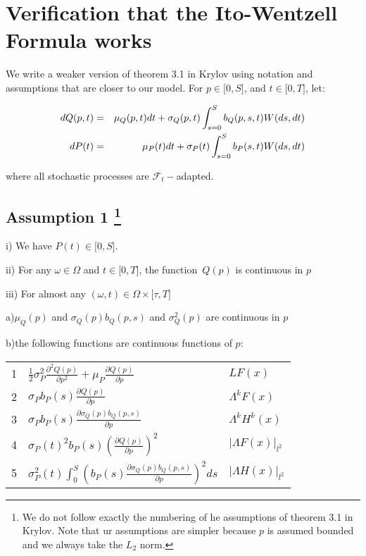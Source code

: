\documentclass{article}
\begin{document}
\section{Verification that the Ito-Wentzell Formula works}

We write a weaker version of theorem 3.1 in Krylov using notation and
assumptions that are closer to our model. For $p\in \lbrack 0,S]$, and $t\in
\lbrack 0,T]$, let:

\begin{eqnarray}
dQ(p,t) &=&\mu _{Q}(p,t)dt+\sigma _{Q}(p,t)\int_{s=0}^{S}b_{Q}(p,s,t)W(ds,dt)
\label{dQ} \\
dP(t) &=&\mu _{P}(t)dt+\sigma _{P}(t)\int_{s=0}^{S}b_{P}(s,t)W(ds,dt)  \notag
\end{eqnarray}

where all stochastic processes are $\mathcal{F}_{t}-$adapted.

\bigskip

\subsection{Assumption 1 \protect\footnote{%
We do not follow exactly the numbering of he assumptions of theorem 3.1 in
Krylov. Note that ur assumptions are simpler because $p$ is assumed bounded
and we always take the $L_{2}$ norm.}}

i) We have $P(t)\in \lbrack 0,S]$.

ii) For any $\omega \in \Omega $ and $t\in \lbrack 0,T]$, the function\ $%
Q(p) $ is continuous in $p$

iii) For almost any $(\omega ,t)\in \Omega \times \lbrack \tau ,T]$

\qquad a)$\mu _{Q}(p)$ and $\sigma _{Q}(p)b_{Q}(p,s)$ and $\sigma
_{Q}^{2}(p) $ are continuous in $p$

\qquad b)the following functions are continuous functions of $p$:

\qquad \qquad 
\begin{tabular}{lll}
1 & $\frac{1}{2}\sigma _{P}^{2}\frac{\partial ^{2}Q(p)}{\partial p^{2}}+\mu
_{P}\frac{\partial Q(p)}{\partial p}$ & $LF(x)$ \\ 
2 & $\sigma _{P}b_{P}(s)\frac{\partial Q(p)}{\partial p}$ & $\Lambda
^{k}F(x) $ \\ 
3 & $\sigma _{P}b_{P}(s)\frac{\partial \sigma _{Q}(p)b_{Q}(p,s)}{\partial p}$
& $\Lambda ^{k}H^{k}(x)$ \\ 
4 & $\sigma _{P}(t)^{2}b_{P}(s)(\frac{\partial Q(p)}{\partial p})^{2}$ & $%
|\Lambda F(x)|_{l^{2}}$ \\ 
5 & $\sigma _{P}^{2}(t)\int_{0}^{S}(b_{P}(s)\frac{\partial \sigma
_{Q}(p)b_{Q}(p,s)}{\partial p})^{2}ds$ & $|\Lambda H(x)|_{l^{2}}$%
\end{tabular}
\end{document}
